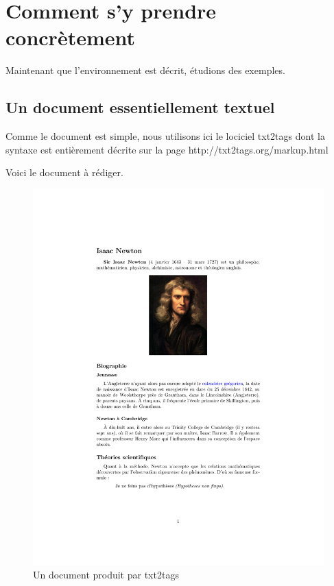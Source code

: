 \documentclass[]{article}
\makeatletter
\def\maxwidth{\ifdim\Gin@nat@width>\linewidth\linewidth
\else\Gin@nat@width\fi}
\let\Oldincludegraphics\includegraphics
\renewcommand{\includegraphics}[1]{\Oldincludegraphics[width=\maxwidth]{#1}}
\makeatother
\begin{document}
\section{Comment s'y prendre concrètement}

Maintenant que l'environnement est décrit, étudions des exemples.

\subsection{Un document essentiellement textuel}

Comme le document est simple, nous utilisons ici le lociciel txt2tags
dont la syntaxe est entièrement décrite sur la page
http://txt2tags.org/markup.html

Voici le document à rédiger.

\begin{figure}[htbp]
\centering
\includegraphics{newton.pdf}
\caption{Un document produit par txt2tags}
\end{figure}
\end{document}
